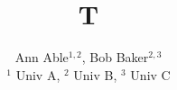 \documentclass{article}
\begin{document}
\title{T}
\author{
Ann Able$^{1,2}$, \quad
Bob Baker$^{2,3}$ \\
\vspace{0.1cm}
$^{1}$ Univ A, $^{2}$ Univ B, $^{3}$ Univ C
}
\maketitle
\end{document}
